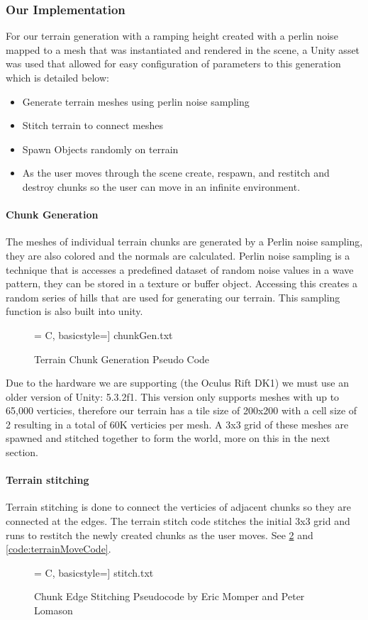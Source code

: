 \documentclass[a4paper,10pt]{article}
\begin{document}
\pagebreak
\subsubsection{Our Implementation}
For our terrain generation with a ramping height created with a perlin noise mapped to a mesh that was instantiated and rendered in the scene, a Unity asset was used that allowed for easy configuration of parameters to this generation which is detailed below:

\begin{itemize}
\item Generate terrain meshes using perlin noise sampling
\item Stitch terrain to connect meshes
\item Spawn Objects randomly on terrain
\item As the user moves through the scene create, respawn, and restitch and destroy chunks so the user can move in an infinite environment.
\end{itemize}

\paragraph{Chunk Generation} 
The meshes of individual terrain chunks are generated by a Perlin noise sampling, they are also colored and the normals are calculated. 
Perlin noise sampling is a technique that is accesses a predefined dataset of random noise values in a wave pattern, they can be stored in a texture or buffer object. Accessing this creates a random series of hills that are used for generating our terrain. This sampling function is also built into unity. 


\begin{figure}[H]
	 = C, basicstyle=\small] {chunkGen.txt}
	\caption{Terrain Chunk Generation Pseudo Code}
	\label{fig:TerrainChunkCode}
\end{figure}
Due to the hardware we are supporting (the Oculus Rift DK1) we must use an older version of Unity: 5.3.2f1. This version only supports meshes with up to 65,000 verticies, therefore our terrain has a tile size of 200x200 with a cell size of 2 resulting in a total of 60K verticies per mesh. A 3x3 grid of these meshes are spawned and stitched together to form the world, more on this in the next section.

\paragraph{Terrain stitching}
Terrain stitching is done to connect the verticies of adjacent chunks so they are connected at the edges. The terrain stitch code stitches the initial 3x3 grid and runs to restitch the newly created chunks as the user moves. See \ref{code:terrainStitchCode} and \ref{code:terrainMoveCode}.
\begin{figure}[H]
	\centerline{ = C, basicstyle=\small] {stitch.txt} }
	\caption{Chunk Edge Stitching Pseudocode by Eric Momper and Peter Lomason}
	\label{code:terrainStitchCode}
\end{figure}
\end{document}
